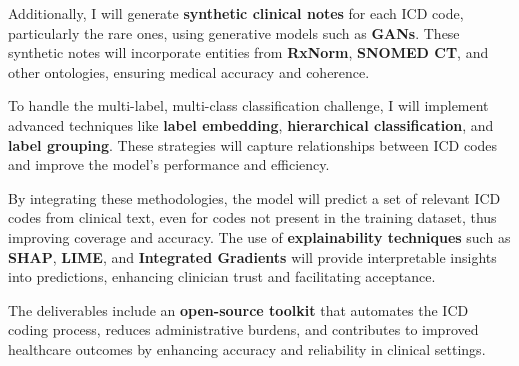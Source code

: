 \documentclass[10pt,a4paper]{article}
\begin{document}
Additionally, I will generate \textbf{synthetic clinical notes} for each ICD code, particularly the rare ones, using generative models such as \textbf{GANs}. These synthetic notes will incorporate entities from \textbf{RxNorm}, \textbf{SNOMED CT}, and other ontologies, ensuring medical accuracy and coherence.

To handle the multi-label, multi-class classification challenge, I will implement advanced techniques like \textbf{label embedding}, \textbf{hierarchical classification}, and \textbf{label grouping}. These strategies will capture relationships between ICD codes and improve the model's performance and efficiency.

By integrating these methodologies, the model will predict a set of relevant ICD codes from clinical text, even for codes not present in the training dataset, thus improving coverage and accuracy. The use of \textbf{explainability techniques} such as \textbf{SHAP}, \textbf{LIME}, and \textbf{Integrated Gradients} will provide interpretable insights into predictions, enhancing clinician trust and facilitating acceptance.

The deliverables include an \textbf{open-source toolkit} that automates the ICD coding process, reduces administrative burdens, and contributes to improved healthcare outcomes by enhancing accuracy and reliability in clinical settings.
\end{document}
